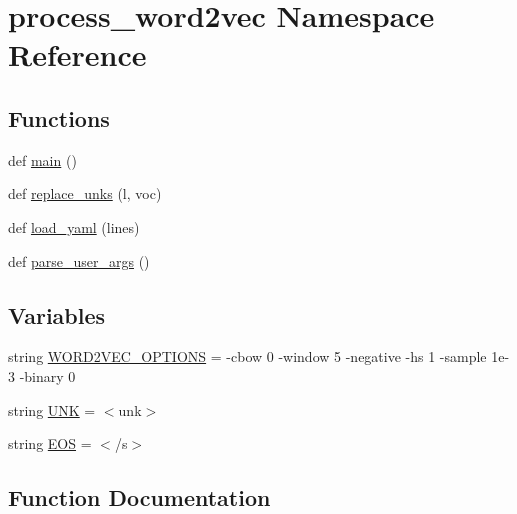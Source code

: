 \hypertarget{namespaceprocess__word2vec}{}\section{process\+\_\+word2vec Namespace Reference}
\label{namespaceprocess__word2vec}
\subsection*{Functions}
\begin{DoxyCompactItemize}
\item 
def \hyperlink{namespaceprocess__word2vec_ab3d9c1343a892a23ca1e60230b030dce}{main} ()
\item 
def \hyperlink{namespaceprocess__word2vec_a0c9fc4391f1004542a2cd02996445980}{replace\+\_\+unks} (l, voc)
\item 
def \hyperlink{namespaceprocess__word2vec_a6e39a5dbf33a1c2bb0d4c2354051203f}{load\+\_\+yaml} (lines)
\item 
def \hyperlink{namespaceprocess__word2vec_a104f2b1f7f16fe4bb005d75d662b5407}{parse\+\_\+user\+\_\+args} ()
\end{DoxyCompactItemize}
\subsection*{Variables}
\begin{DoxyCompactItemize}
\item 
string \hyperlink{namespaceprocess__word2vec_a56790e0ff66512140343a1430a181340}{W\+O\+R\+D2\+V\+E\+C\+\_\+\+O\+P\+T\+I\+O\+NS} = \textquotesingle{}-\/cbow 0 -\/window 5 -\/negative -\/hs 1 -\/sample 1e-\/3 -\/binary 0\textquotesingle{}
\item 
string \hyperlink{namespaceprocess__word2vec_a416fec5596d37bdd6ace89870779feec}{U\+NK} = \textquotesingle{}$<$unk$>$\textquotesingle{}
\item 
string \hyperlink{namespaceprocess__word2vec_a3bd8d79e8af7445e67a587bdbdb78778}{E\+OS} = \textquotesingle{}$<$/s$>$\textquotesingle{}
\end{DoxyCompactItemize}


\subsection{Function Documentation}
